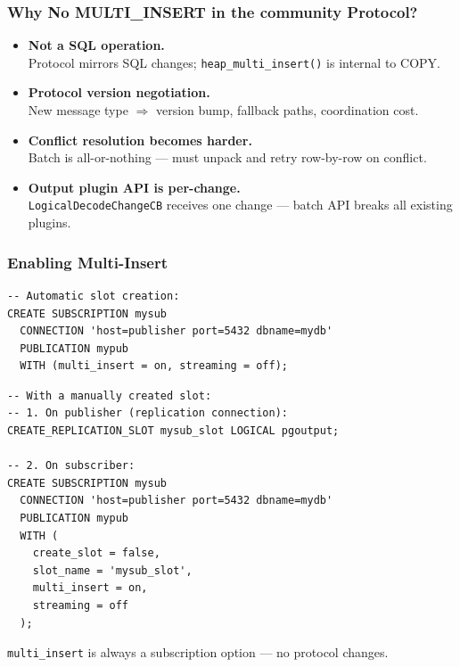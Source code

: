 \documentclass{beamer}
\begin{document}
\begin{frame}\frametitle{Why No MULTI\_INSERT in the community Protocol?}
\bigskip

\begin{itemize}\setlength{\itemsep}{8pt}
  \item \textbf{Not a SQL operation.}\\
        Protocol mirrors SQL changes; \texttt{heap\_multi\_insert()} is
        internal to COPY.
  \item \textbf{Protocol version negotiation.}\\
        New message type $\Rightarrow$ version bump, fallback paths,
        coordination cost.
  \item \textbf{Conflict resolution becomes harder.}\\
        Batch is all-or-nothing --- must unpack and retry row-by-row
        on conflict.
  \item \textbf{Output plugin API is per-change.}\\
        \texttt{LogicalDecodeChangeCB} receives one change ---
        batch API breaks all existing plugins.
\end{itemize}
\end{frame}

\begin{frame}[fragile]\frametitle{Enabling Multi-Insert}
\begin{lstlisting}
-- Automatic slot creation:
CREATE SUBSCRIPTION mysub
  CONNECTION 'host=publisher port=5432 dbname=mydb'
  PUBLICATION mypub
  WITH (multi_insert = on, streaming = off);
\end{lstlisting}
\bigskip
\begin{lstlisting}
-- With a manually created slot:
-- 1. On publisher (replication connection):
CREATE_REPLICATION_SLOT mysub_slot LOGICAL pgoutput;

-- 2. On subscriber:
CREATE SUBSCRIPTION mysub
  CONNECTION 'host=publisher port=5432 dbname=mydb'
  PUBLICATION mypub
  WITH (
    create_slot = false,
    slot_name = 'mysub_slot',
    multi_insert = on,
    streaming = off
  );
\end{lstlisting}
\smallskip
{\small \texttt{multi\_insert} is always a subscription option ---
no protocol changes.}
\end{frame}

\end{document}
